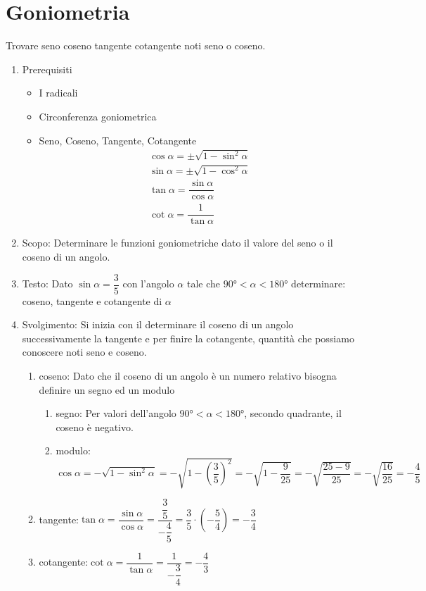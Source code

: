 \section{Goniometria}
\label{sec:EsempiGoniometria}
\begin{table}[H]
	\caption{Trovare seno coseno tangente cotangente noti seno o coseno.}
	\label{tab:trovaresencosnoti}
\begin{enumerate}
	\item Prerequisiti 
\begin{itemize}
	\item I radicali
	\item Circonferenza goniometrica
	\item Seno, Coseno, Tangente, Cotangente
  \begin {align*}
	\cos\alpha=\pm\sqrt{1-\sin^2\alpha}\\
	\sin\alpha=\pm\sqrt{1-\cos^2\alpha}\\
	\tan\alpha=\dfrac{\sin\alpha}{\cos\alpha}\\
	\cot\alpha=\dfrac{1}{\tan\alpha}
	\end{align*}
\end{itemize}
  \item Scopo: Determinare le funzioni goniometriche dato il valore del seno o il coseno di un angolo.
  \item Testo: Dato $\sin\alpha=\dfrac{3}{5}$ con l'angolo $\alpha$ tale che $\ang{90}<\alpha<\ang{180}$ determinare: coseno, tangente e cotangente di $\alpha$
  \item Svolgimento: Si inizia con il determinare il coseno di un angolo successivamente la tangente e per finire la cotangente, quantità che possiamo conoscere noti seno e coseno. 
  \begin{enumerate}
	\item coseno: Dato che il coseno di un angolo è un numero relativo bisogna definire un segno ed un modulo
	\begin{enumerate}
	\item segno: Per valori dell'angolo  $\ang{90}<\alpha<\ang{180}$, secondo quadrante, il coseno è negativo. 
	\item modulo: $\cos\alpha=-\sqrt{1-\sin^2\alpha}=-\sqrt{1-\left(\dfrac{3}{5}\right)^2}=-\sqrt{1-\dfrac{9}{25}}=-\sqrt{\dfrac{25-9}{25}}=-\sqrt{\dfrac{16}{25}}=-\dfrac{4}{5}$
\end{enumerate}
	\item tangente:$\tan\alpha=\dfrac{\sin\alpha}{\cos\alpha}=\dfrac{\dfrac{3}{5}}{-\dfrac{4}{5}}=\dfrac{3}{5}\cdot\left(-\dfrac{5}{4} \right)=-\dfrac{3}{4}$
  \item cotangente:$\cot\alpha=\dfrac{1}{\tan\alpha}=\dfrac{1}{-\dfrac{3}{4}}=-\dfrac{4}{3}$
\end{enumerate}
 \end{enumerate}
\end{table}
